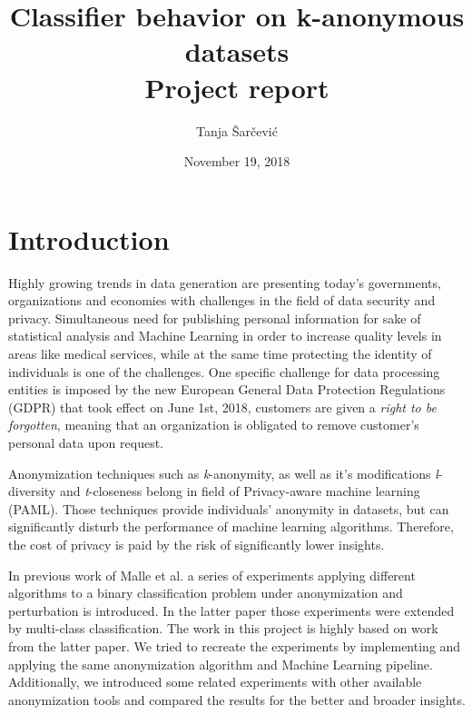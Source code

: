 \documentclass{article}
\begin{document}
\author{Tanja Šarčević}
\title{Classifier behavior on k-anonymous datasets \\ 
	 \large Project report}
\date{November 19, 2018}
\maketitle{} 

\section{Introduction}
Highly growing trends in data generation are presenting today's governments, organizations and economies with challenges in the field of data security and privacy. Simultaneous need for publishing personal information for sake of statistical analysis and Machine Learning in order to increase quality levels in areas like medical services, while at the same time protecting the identity of individuals is one of the challenges. One specific challenge for data processing entities is imposed by the new European General Data Protection Regulations (GDPR) that took effect on June 1st, 2018, customers are given a \textit{right to be forgotten}, meaning that an organization is obligated to remove customer's personal data upon request. 

Anonymization techniques such as \textit{k}-anonymity, as well as it's modifications \textit{l}-diversity and \textit{t}-closeness belong in field of Privacy-aware machine learning (PAML). Those techniques provide individuals' anonymity in datasets, but can significantly disturb the performance of machine learning algorithms. Therefore, the cost of privacy is paid by the risk of significantly lower insights. 

In previous work of Malle et al. \cite{malle2016right} a series of experiments applying different algorithms to a binary classification problem under anonymization and perturbation is introduced. In the latter paper \cite{malle2017not} those experiments were extended by multi-class classification. The work in this project is highly based on work from the latter paper. We tried to recreate the experiments by implementing and applying the same anonymization algorithm and Machine Learning pipeline. Additionally, we introduced some related experiments with other available anonymization tools and compared the results for the better and broader insights.
\newpage
\end{document}
